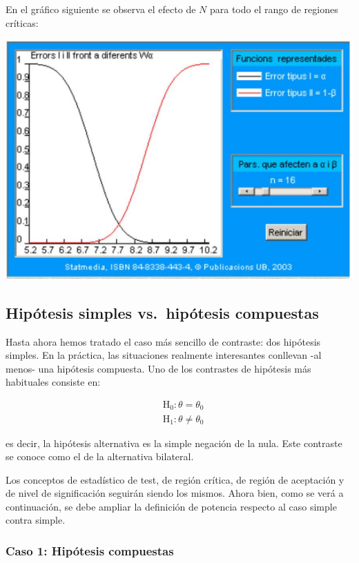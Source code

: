 \documentclass[
]{article}
\begin{document}
En el gráfico siguiente se observa el efecto de \(N\) para todo el rango de regiones críticas:

\begin{center}\includegraphics[width=0.9\linewidth]{images/cap9-SampleSizeEffect-3} \end{center}

\subsection{Hipótesis simples vs.~hipótesis compuestas}\label{hipuxf3tesis-simples-vs.-hipuxf3tesis-compuestas}

Hasta ahora hemos tratado el caso más sencillo de contraste: dos hipótesis simples. En la práctica, las situaciones realmente interesantes conllevan -al menos- una hipótesis compuesta. Uno de los contrastes de hipótesis más habituales consiste en:

\[
\begin{aligned}
& \mathrm{H}_{0}: \theta=\theta_{0} \\
& \mathrm{H}_{1}: \theta \neq \theta_{0}
\end{aligned}
\]

es decir, la hipótesis alternativa es la simple negación de la nula. Este contraste se conoce como el de la alternativa bilateral.

Los conceptos de estadístico de test, de región crítica, de región de aceptación y de nivel de significación seguirán siendo los mismos. Ahora bien, como se verá a continuación, se debe ampliar la definición de potencia respecto al caso simple contra simple.

\subsubsection{Caso 1: Hipótesis compuestas}\label{caso-1-hipuxf3tesis-compuestas}
\end{document}
